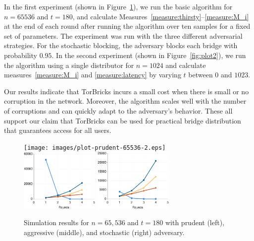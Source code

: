 \documentclass[a4paper,UKenglish]{lipics-v2016}
\newcommand{\bricks}{}
\def\bricks/{\mbox{TorBricks}}
\begin{document}
In the first experiment (shown in Figure~\ref{fig:plot1}), we run the basic algorithm for ${n=65536}$ and ${t=180}$, and calculate Measures~\ref{measure:thirsty}--\ref{measure:M_i} at the end of each round after running the algorithm over ten samples for a fixed set of parameters. The experiment was run with the three different adversarial strategies. For the stochastic blocking, the adversary blocks each bridge with probability $0.95$. %
In the second experiment (shown in Figure~\ref{fig:plot2}), we run the algorithm using a single distributor for ${n=1024}$ and calculate measures~\ref{measure:M_i} and \ref{measure:latency} by varying $t$ between $0$ and $1023$.

Our results indicate that \bricks/ incurs a small cost when there is small or no corruption in the network. Moreover, the algorithm scales well with the number of corruptions and can quickly adapt to the adversary's behavior. These all support our claim that \bricks/ can be used for practical bridge distribution that guarantees access for all users.

\begin{figure}[t]
	\hspace{-0.8em}\texttt{[image: images/plot-prudent-65536-2.eps]}
	\hspace{-0.5em}\includegraphics[width=0.34\textwidth]{images/plot-aggressive-65536.eps}
	\hspace{-0.5em}\includegraphics[width=0.34\textwidth]{images/plot-stochastic-65536.eps}
	\caption{Simulation results for ${n=65,536}$ and ${t=180}$ with prudent (left), aggressive (middle), and stochastic (right) adversary.}
	\label{fig:plot1} 
\end{figure}
\end{document}

